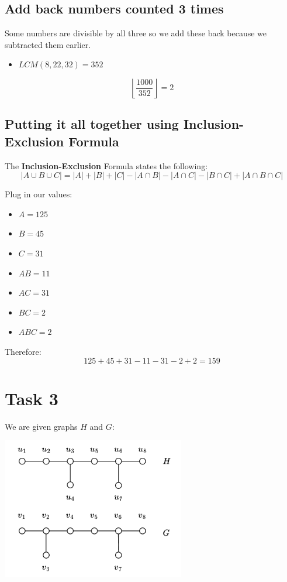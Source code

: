 \documentclass[11pt]{article}
\begin{document}
\subsection{Add back numbers counted 3 times}
\label{sec:org4a38d6f}
Some numbers are divisible by all three so we add these back because we subtracted them earlier.
\begin{itemize}
\item \(LCM(8, 22, 32) = 352\)
\end{itemize}
\[
\left\lfloor \frac{1000}{352} \right\rfloor = 2
\]
\subsection{Putting it all together using Inclusion-Exclusion Formula}
\label{sec:orgeaef607}
The \textbf{Inclusion-Exclusion} Formula states the following:
\[
\left|A \cup B \cup C \right| = \left|A\right| + \left|B\right| + \left|C \right| - \left|A \cap B \right| - \left|A \cap C \right| - \left|B \cap C \right| + \left|A \cap B \cap C \right|
\]

Plug in our values:
\begin{itemize}
\item \(A = 125\)
\item \(B = 45\)
\item \(C = 31\)
\item \(AB = 11\)
\item \(AC = 31\)
\item \(BC = 2\)
\item \(ABC = 2\)
\end{itemize}

Therefore:
\[
125 + 45 + 31 - 11 - 31 - 2 + 2 = 159
\]

\newpage
\section{Task 3}
\label{sec:org8376763}
We are given graphs \(H\) and \(G\):
\begin{center}
\includegraphics[width=0.6\textwidth]{./grappherr.png}
\end{center}
\end{document}
